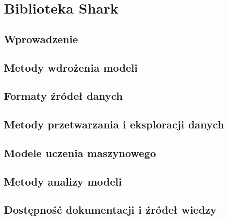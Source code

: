 \chapter{Biblioteka Shark}

\section{Wprowadzenie}
\section{Metody wdrożenia modeli}
\section{Formaty źródeł danych}
\section{Metody przetwarzania i eksploracji danych}
\section{Modele uczenia maszynowego}
\section{Metody analizy modeli}
\section{Dostępność dokumentacji i źródeł wiedzy}